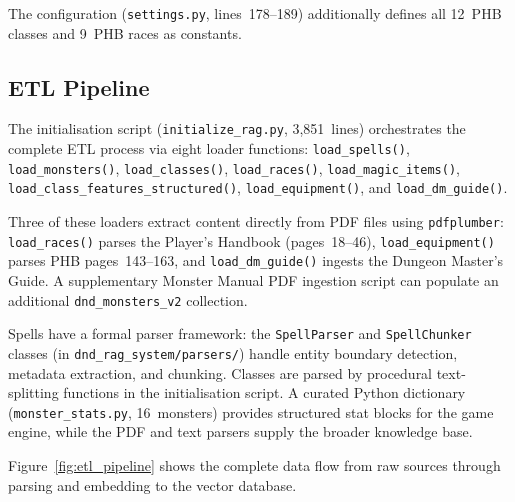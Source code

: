 \documentclass[12pt,a4paper]{article}
\begin{document}
The configuration (\texttt{settings.py}, lines~178--189) additionally defines
all 12~PHB classes and 9~PHB races as constants.

\subsection{ETL Pipeline}

The initialisation script (\texttt{initialize\_rag.py}, 3,851~lines)
orchestrates the complete ETL process via eight loader functions:
\texttt{load\_spells()}, \texttt{load\_monsters()}, \texttt{load\_classes()},
\texttt{load\_races()}, \texttt{load\_magic\_items()},
\texttt{load\_class\_features\_structured()}, \texttt{load\_equipment()},
and \texttt{load\_dm\_guide()}.

Three of these loaders extract content directly from PDF files using
\texttt{pdfplumber}: \texttt{load\_races()} parses the Player's Handbook
(pages~18--46), \texttt{load\_equipment()} parses PHB pages~143--163, and
\texttt{load\_dm\_guide()} ingests the Dungeon Master's Guide.
A supplementary Monster Manual PDF ingestion script can populate an
additional \texttt{dnd\_monsters\_v2} collection.

Spells have a formal parser framework: the \texttt{SpellParser} and
\texttt{SpellChunker} classes (in \texttt{dnd\_rag\_system/parsers/})
handle entity boundary detection, metadata extraction, and chunking.
Classes are parsed by procedural text-splitting functions in the
initialisation script. A curated Python dictionary
(\texttt{monster\_stats.py}, 16~monsters) provides structured stat blocks
for the game engine, while the PDF and text parsers supply the broader
knowledge base.

Figure~\ref{fig:etl_pipeline} shows the complete data flow from raw sources
through parsing and embedding to the vector database.
\end{document}
